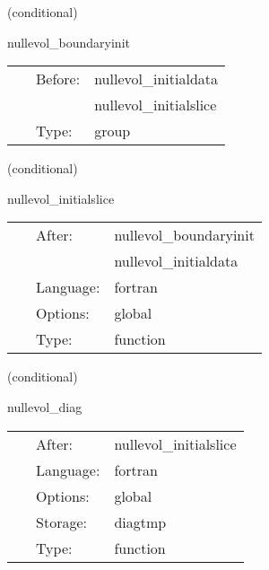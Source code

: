 \vspace{5mm}

   (conditional) 

\hspace{5mm} nullevol\_boundaryinit 

\hspace{5mm}{\it boundary data for the characteristic data } 


\hspace{5mm}

 \begin{tabular*}{160mm}{cll} 
~ & Before:  & nullevol\_initialdata \\ 
~& ~ &nullevol\_initialslice\\ 
~ & Type:  & group \\ 
\end{tabular*} 


\vspace{5mm}

   (conditional) 

\hspace{5mm} nullevol\_initialslice 

\hspace{5mm}{\it construct null metric on the initial null hypersurface } 


\hspace{5mm}

 \begin{tabular*}{160mm}{cll} 
~ & After:  & nullevol\_boundaryinit \\ 
~& ~ &nullevol\_initialdata\\ 
~ & Language:  & fortran \\ 
~ & Options:  & global \\ 
~ & Type:  & function \\ 
\end{tabular*} 


\vspace{5mm}

   (conditional) 

\hspace{5mm} nullevol\_diag 

\hspace{5mm}{\it diagnostics of the characteristic code } 


\hspace{5mm}

 \begin{tabular*}{160mm}{cll} 
~ & After:  & nullevol\_initialslice \\ 
~ & Language:  & fortran \\ 
~ & Options:  & global \\ 
~ & Storage:  & diagtmp \\ 
~ & Type:  & function \\ 
\end{tabular*} 


